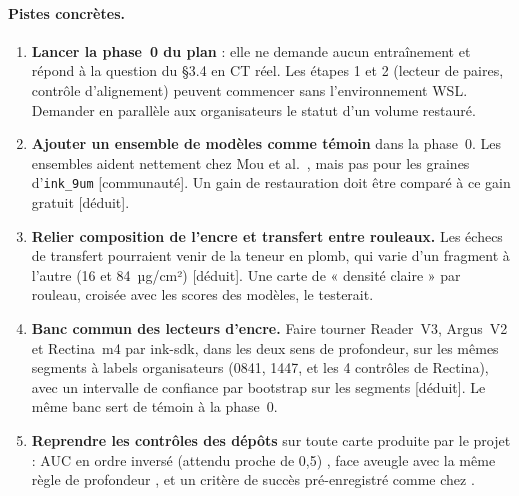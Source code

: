 \documentclass[11pt,a4paper]{article}
\newcommand{\deduit}{\textsf{\small[déduit]}}
\newcommand{\commu}{\textsf{\small[communauté]}}
\begin{document}
\paragraph{Pistes concrètes.}
\begin{enumerate}
  \item \textbf{Lancer la phase~0 du plan} : elle ne demande aucun entraînement et répond à
  la question du §3.4 en CT réel. Les étapes 1 et 2 (lecteur de paires, contrôle
  d'alignement) peuvent commencer sans l'environnement WSL. Demander en parallèle aux
  organisateurs le statut d'un volume restauré.
  \item \textbf{Ajouter un ensemble de modèles comme témoin} dans la phase~0. Les ensembles
  aident nettement chez Mou et al.\ \cite{mou2023}, mais pas pour les graines
  d'\texttt{ink\_9um} \commu. Un gain de restauration doit être comparé à ce gain gratuit
  \deduit.
  \item \textbf{Relier composition de l'encre et transfert entre rouleaux.} Les échecs de
  transfert pourraient venir de la teneur en plomb, qui varie d'un fragment à l'autre (16 et
  84~µg/cm²) \cite{tack2016} \deduit. Une carte de « densité claire » par rouleau, croisée
  avec les scores des modèles, le testerait.
  \item \textbf{Banc commun des lecteurs d'encre.} Faire tourner Reader~V3, Argus~V2 et
  Rectina~m4 par ink-sdk, dans les deux sens de profondeur, sur les mêmes segments à labels
  organisateurs (0841, 1447, et les 4 contrôles de Rectina), avec un intervalle de confiance
  par bootstrap sur les segments \cite{limegs2026sdk,ruiconte2026,pellerano2026} \deduit. Le
  même banc sert de témoin à la phase~0.
  \item \textbf{Reprendre les contrôles des dépôts} sur toute carte produite par le projet :
  AUC en ordre inversé (attendu proche de 0,5) \cite{ruiconte2026}, face aveugle avec la
  même règle de profondeur \cite{demeij2026}, et un critère de succès pré-enregistré comme
  chez \cite{snyder2026}.
\end{enumerate}
\end{document}

